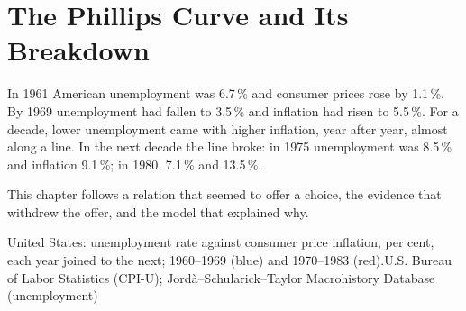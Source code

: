 \chapter{The Phillips Curve and Its Breakdown}\label{ch:g12:phillips-curve}

In 1961 American unemployment was 6.7\,\% and consumer prices rose by 1.1\,\%. By 1969 unemployment had fallen to 3.5\,\% and inflation had risen to 5.5\,\%. For a decade,
lower unemployment came with higher inflation, year after year, almost along a line. In the next decade the line broke: in 1975 unemployment was 8.5\,\% and inflation
9.1\,\%; in 1980, 7.1\,\% and 13.5\,\%.

This chapter follows a relation that seemed to offer a choice, the evidence that withdrew the offer, and the model that explained why.

\begin{openingchart}{United States: unemployment rate against consumer price inflation, per cent, each year joined to the next; 1960--1969 (blue) and 1970--1983 (red).}{U.S.
Bureau of Labor Statistics (CPI-U); Jordà--Schularick--Taylor Macrohistory Database (unemployment)}
\end{openingchart}

